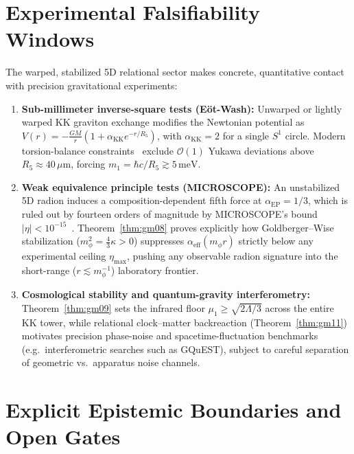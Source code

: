 \documentclass[11pt,a4paper]{article}
\theoremstyle{plain}
\theoremstyle{remark}
\begin{document}
\section{Experimental Falsifiability Windows}
\label{sec:experiments}

The warped, stabilized 5D relational sector makes concrete, quantitative contact with precision gravitational experiments:

\begin{enumerate}
  \item \textbf{Sub-millimeter inverse-square tests (E\"ot-Wash):} Unwarped or lightly warped KK graviton exchange modifies the Newtonian potential as $V(r) = -\frac{GM}{r}(1 + \alpha_{\mathrm{KK}} e^{-r/R_5})$, with $\alpha_{\mathrm{KK}} = 2$ for a single $S^1$ circle. Modern torsion-balance constraints~\cite{Lee2020EotWash} exclude $\mathcal{O}(1)$ Yukawa deviations above $R_5 \approx 40\,\mu\mathrm{m}$, forcing $m_1 = \hbar c/R_5 \gtrsim 5\,\mathrm{meV}$.
  \item \textbf{Weak equivalence principle tests (MICROSCOPE):} An unstabilized 5D radion induces a composition-dependent fifth force at $\alpha_{\mathrm{EP}} = 1/3$, which is ruled out by fourteen orders of magnitude by MICROSCOPE's bound $|\eta| < 10^{-15}$~\cite{MICROSCOPE2022}. Theorem~\ref{thm:gm08} proves explicitly how Goldberger--Wise stabilization ($m_\phi^2 = \frac{4}{3}\kappa > 0$) suppresses $\alpha_{\mathrm{eff}}(m_\phi r)$ strictly below any experimental ceiling $\eta_{\max}$, pushing any observable radion signature into the short-range ($r \lesssim m_\phi^{-1}$) laboratory frontier.
  \item \textbf{Cosmological stability and quantum-gravity interferometry:} Theorem~\ref{thm:gm09} sets the infrared floor $\mu_1 \ge \sqrt{2\Lambda/3}$ across the entire KK tower, while relational clock--matter backreaction (Theorem~\ref{thm:gm11}) motivates precision phase-noise and spacetime-fluctuation benchmarks (e.g.\ interferometric searches such as GQuEST), subject to careful separation of geometric vs.\ apparatus noise channels.
\end{enumerate}

\section{Explicit Epistemic Boundaries and Open Gates}
\label{sec:open-gates}
\end{document}
